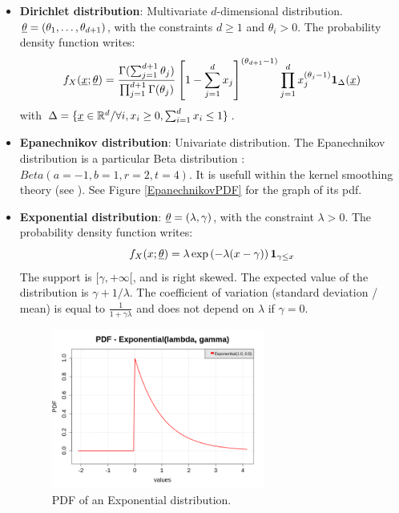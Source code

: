 {\begin{itemize}
\item {\bf Dirichlet distribution}: Multivariate $d$-dimensional distribution. ${\underline{\theta}} = ( \theta_1, \hdots, \theta_{d+1})$, with the constraints $d \geq 1$ and $\theta_i>0$. The probability density function writes:
\begin{equation}
f_X({\underline{x}};{\underline{\theta}}) = \displaystyle \frac{\Gamma(\sum_{j=1}^{d+1}\theta_j)}{\prod_{j=1}^{d+1}\Gamma(\theta_j)} \left[ 1-\sum_{j=1}^{d} x_j\right]^{(\theta_{d+1}-1)}\prod_{j=1}^d x_j^{(\theta_j-1)}\mathbf{1}_{\Delta}({\underline{x}})
\end{equation}
with $\Delta = \{ {\underline{x}} \in {\mathbb R}^d / \forall i, x_i \geq 0, \sum_{i=1}^{d} x_i \leq 1 \}$.



\item {\bf Epanechnikov distribution}: Univariate distribution. The Epanechnikov distribution is a particular Beta distribution : $Beta (a=-1, b=1, r=2, t=4)$. It is usefull within the kernel smoothing theory (see ). See Figure \ref{EpanechnikovPDF} for the graph of its pdf.


\item {\bf Exponential distribution}: ${\underline{\theta}} = \left( \lambda, \gamma \right)$, with the constraint $\lambda>0$. The probability density function writes:
\begin{equation}
f_X(x;{\underline{\theta}}) = \lambda \exp \left( -\lambda(x-\gamma) \right) \mathbf{1}_{\gamma \leq x}
\end{equation}
The support is $[\gamma,+\infty[$, and is right skewed. The expected value of the distribution is $\gamma + 1/\lambda$. The coefficient of variation (standard deviation / mean) is equal to $\frac{1}{1+\gamma\lambda}$ and does not depend on $\lambda$ if $\gamma=0$.


\begin{figure}[H]
\begin{center}
\includegraphics[width=7cm]{Figures/pdf_Exponential.png}
\caption{PDF of an Exponential distribution.}
\end{center}
\end{figure}



\end{itemize}}
